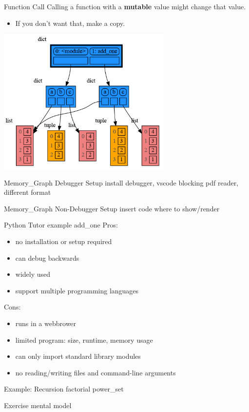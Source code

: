 \documentclass[10pt, colorlinks=true, urlcolor=blue]{beamer}
\begin{document}
\begin{frame}{Function Call}
  Calling a function with a \textbf{mutable} value might change that value.
  \begin{itemize}
  \item If you don't want that, make a copy.
  \end{itemize}
  \begin{center}\includegraphics[width=0.65\textwidth]{figures/function_call.png}\end{center}
\end{frame}

\begin{frame}{Memory\_Graph Debugger Setup}
  install
  debugger, vscode
  blocking pdf reader, different format
\end{frame}

\begin{frame}{Memory\_Graph Non-Debugger Setup}
  insert code where to show/render
\end{frame}

\begin{frame}{Python Tutor}
  example add\_one
  Pros:
  \begin{itemize}
  \item no installation or setup required
  \item can debug backwards
  \item widely used
  \item support multiple programming languages
  \end{itemize}
  Cons:
  \begin{itemize}
  \item runs in a webbrower
  \item limited program: size, runtime, memory usage
  \item can only import standard library modules
  \item no reading/writing files and command-line arguments 
  \end{itemize}
\end{frame}

\begin{frame}{Example: Recursion}
  factorial
  power\_set
\end{frame}

\begin{frame}{Exercise}
  mental model
\end{frame}
\end{document}

